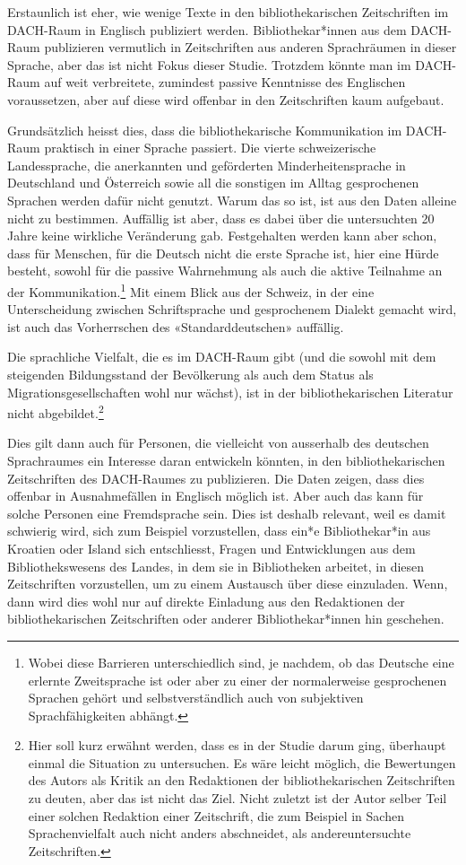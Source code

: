 \documentclass[a4paper,
fontsize=11pt,
oneside,
numbers=noperiodatend,
parskip=half-,
bibliography=totoc,
final
]{scrartcl}
\begin{document}
Erstaunlich ist eher, wie wenige Texte in den bibliothekarischen
Zeitschriften im DACH-Raum in Englisch publiziert werden.
Bibliothekar*innen aus dem DACH-Raum publizieren vermutlich in
Zeitschriften aus anderen Sprachräumen in dieser Sprache, aber das ist
nicht Fokus dieser Studie. Trotzdem könnte man im DACH-Raum auf weit
verbreitete, zumindest passive Kenntnisse des Englischen voraussetzen,
aber auf diese wird offenbar in den Zeitschriften kaum aufgebaut.

Grundsätzlich heisst dies, dass die bibliothekarische Kommunikation im
DACH-Raum praktisch in einer Sprache passiert. Die vierte schweizerische
Landessprache, die anerkannten und geförderten Minderheitensprache in
Deutschland und Österreich sowie all die sonstigen im Alltag
gesprochenen Sprachen werden dafür nicht genutzt. Warum das so ist, ist
aus den Daten alleine nicht zu bestimmen. Auffällig ist aber, dass es
dabei über die untersuchten 20 Jahre keine wirkliche Veränderung gab.
Festgehalten werden kann aber schon, dass für Menschen, für die Deutsch
nicht die erste Sprache ist, hier eine Hürde besteht, sowohl für die
passive Wahrnehmung als auch die aktive Teilnahme an der
Kommunikation.\footnote{Wobei diese Barrieren unterschiedlich sind, je
  nachdem, ob das Deutsche eine erlernte Zweitsprache ist oder aber zu
  einer der normalerweise gesprochenen Sprachen gehört und
  selbstverständlich auch von subjektiven Sprachfähigkeiten abhängt.}
Mit einem Blick aus der Schweiz, in der eine Unterscheidung zwischen
Schriftsprache und gesprochenem Dialekt gemacht wird, ist auch das
Vorherrschen des «Standarddeutschen» auffällig.

Die sprachliche Vielfalt, die es im DACH-Raum gibt (und die sowohl mit
dem steigenden Bildungsstand der Bevölkerung als auch dem Status als
Migrationsgesellschaften wohl nur wächst), ist in der bibliothekarischen
Literatur nicht abgebildet.\footnote{Hier soll kurz erwähnt werden, dass
  es in der Studie darum ging, überhaupt einmal die Situation zu
  untersuchen. Es wäre leicht möglich, die Bewertungen des Autors als
  Kritik an den Redaktionen der bibliothekarischen Zeitschriften zu
  deuten, aber das ist nicht das Ziel. Nicht zuletzt ist der Autor
  selber Teil einer solchen Redaktion einer Zeitschrift, die zum
  Beispiel in Sachen Sprachenvielfalt auch nicht anders abschneidet, als
  andereuntersuchte Zeitschriften.}

Dies gilt dann auch für Personen, die vielleicht von ausserhalb des
deutschen Sprachraumes ein Interesse daran entwickeln könnten, in den
bibliothekarischen Zeitschriften des DACH-Raumes zu publizieren. Die
Daten zeigen, dass dies offenbar in Ausnahmefällen in Englisch möglich
ist. Aber auch das kann für solche Personen eine Fremdsprache sein. Dies
ist deshalb relevant, weil es damit schwierig wird, sich zum Beispiel
vorzustellen, dass ein*e Bibliothekar*in aus Kroatien oder Island sich
entschliesst, Fragen und Entwicklungen aus dem Bibliothekswesens des
Landes, in dem sie in Bibliotheken arbeitet, in diesen Zeitschriften
vorzustellen, um zu einem Austausch über diese einzuladen. Wenn, dann
wird dies wohl nur auf direkte Einladung aus den Redaktionen der
bibliothekarischen Zeitschriften oder anderer Bibliothekar*innen hin
geschehen.
\end{document}
